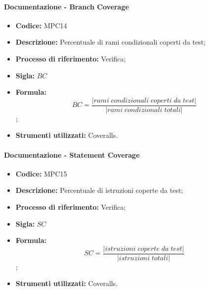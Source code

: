 \paragraph{Documentazione - Branch Coverage}
\begin{itemize}
    \item \textbf{Codice:} MPC14
    \item \textbf{Descrizione:} Percentuale di rami condizionali coperti da test;
    \item \textbf{Processo di riferimento:} Verifica;
    \item \textbf{Sigla:} $BC$
    \item \textbf{Formula:} $$BC = \frac{|rami \; condizionali \; coperti \; da \; test|}{|rami \; condizionali \; totali|} $$;
    \item \textbf{Strumenti utilizzati:} Coveralls.
\end{itemize}

\paragraph{Documentazione - Statement Coverage}
\begin{itemize}
    \item \textbf{Codice:} MPC15
    \item \textbf{Descrizione:} Percentuale di istruzioni coperte da test;
    \item \textbf{Processo di riferimento:} Verifica;
    \item \textbf{Sigla:} $SC$
    \item \textbf{Formula:} $$SC = \frac{|istruzioni \; coperte \; da \; test|}{|istruzioni \; totali|} $$;
    \item \textbf{Strumenti utilizzati:} Coveralls.
\end{itemize}

